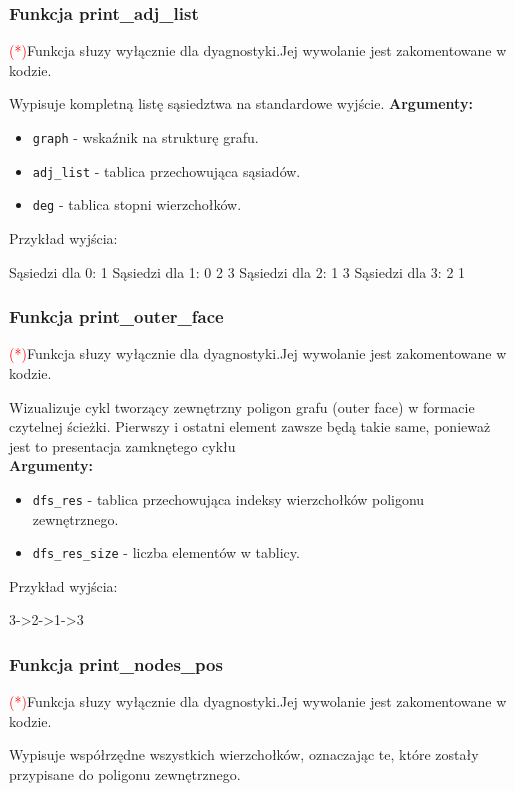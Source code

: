 \documentclass[]{article}
\begin{document}
\subsubsection{Funkcja print\_adj\_list }
\textcolor{red}{(*)}Funkcja słuzy wyłącznie dla dyagnostyki.Jej wywolanie jest zakomentowane w kodzie.


Wypisuje kompletną listę sąsiedztwa na standardowe wyjście.
\textbf{Argumenty:}
\begin{itemize}
\item \texttt{graph} - wskaźnik na strukturę grafu.
\item \texttt{adj\_list} - tablica przechowująca sąsiadów.
\item \texttt{deg} - tablica stopni wierzchołków.
\end{itemize}

Przykład wyjścia:
\begin{mylisting}
Sąsiedzi dla 0: 1 
Sąsiedzi dla 1: 0 2 3 
Sąsiedzi dla 2: 1 3 
Sąsiedzi dla 3: 2 1 
\end{mylisting}


\subsubsection{Funkcja print\_outer\_face}
\textcolor{red}{(*)}Funkcja słuzy wyłącznie dla dyagnostyki.Jej wywolanie jest zakomentowane w kodzie.

Wizualizuje cykl tworzący zewnętrzny poligon grafu (outer face) w formacie czytelnej ścieżki. 
Pierwszy i ostatni element zawsze będą takie same, ponieważ jest to presentacja zamknętego cykłu\\ 
\textbf{Argumenty:}
\begin{itemize}
\item \texttt{dfs\_res} - tablica przechowująca indeksy wierzchołków poligonu zewnętrznego.
\item \texttt{dfs\_res\_size} - liczba elementów w tablicy.
\end{itemize}
Przykład wyjścia:
\begin{mylisting}
3->2->1->3
\end{mylisting}
\subsubsection{Funkcja print\_nodes\_pos}
\textcolor{red}{(*)}Funkcja słuzy wyłącznie dla dyagnostyki.Jej wywolanie jest zakomentowane w kodzie.

Wypisuje współrzędne wszystkich wierzchołków, oznaczając te, które zostały przypisane do poligonu zewnętrznego.\\
\end{document}
